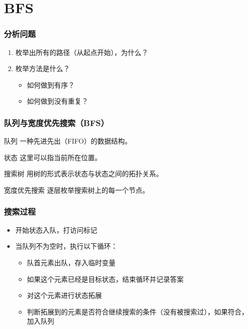\documentclass[11pt]{beamer}
\begin{document}
  \section{BFS}
  \begin{frame}[c]
  	\frametitle{分析问题}
  	\begin{enumerate}
  	  \item 枚举出所有的路径（从起点开始），为什么？\\
  	  \item 枚举方法是什么？
  	    \begin{itemize}
  	      \item 如何做到有序？
  	      \item 如何做到没有重复？
  	    \end{itemize}
    \end{enumerate}
  \end{frame}

  \begin{frame}[c]
  	\frametitle{队列与宽度优先搜索（BFS）}
	  \begin{block}{队列}
      一种先进先出（FIFO）的数据结构。
    \end{block}
    \begin{block}{状态}
      这里可以指当前所在位置。
    \end{block}
    \begin{block}{搜索树}
      用树的形式表示状态与状态之间的拓扑关系。
    \end{block}
    \begin{block}{宽度优先搜索}
      逐层枚举搜索树上的每一个节点。
    \end{block}
  \end{frame}
  
  \begin{frame}[c]
    \frametitle{搜索过程}
    \begin{itemize}
    	\item 开始状态入队，打访问标记
    	\item 当队列不为空时，执行以下循环：
    		\begin{itemize}
    			\item 队首元素出队，存入临时变量
    			\item 如果这个元素已经是目标状态，结束循环并记录答案
    			\item 对这个元素进行状态拓展
    			\item 判断拓展到的元素是否符合继续搜索的条件（没有被搜索过），如果符合，加入队列
    		\end{itemize}
    \end{itemize}
  \end{frame}
\end{document}
